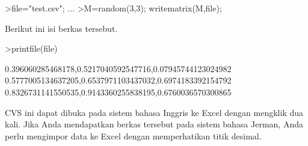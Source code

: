 \documentclass[a4paper,10pt]{article}
\begin{document}
\begin{eulernotebook}
\begin{eulercomment}
\begin{eulercomment}
\begin{eulercomment}
\begin{eulercomment}
\begin{eulercomment}
\begin{eulercomment}
\begin{eulercomment}
\begin{eulercomment}
\begin{eulercomment}
\begin{eulercomment}
\begin{eulercomment}
\begin{eulercomment}
\begin{eulercomment}
\begin{eulercomment}
\begin{eulercomment}
\begin{eulercomment}
\begin{eulercomment}
\begin{eulercomment}
\begin{eulercomment}
\begin{eulercomment}
\begin{eulercomment}
\begin{eulercomment}
\begin{eulercomment}
\begin{eulercomment}
\begin{eulercomment}
\begin{eulercomment}
\begin{eulercomment}
\begin{eulercomment}
\begin{eulercomment}
\begin{eulercomment}
\begin{eulercomment}
\begin{eulercomment}
\begin{eulercomment}
\begin{eulercomment}
\begin{eulercomment}
\begin{eulercomment}
\begin{eulerprompt}
>file="test.csv";  ...
>M=random(3,3); writematrix(M,file);
\end{eulerprompt}
\begin{eulercomment}
Berikut ini isi berkas tersebut.
\end{eulercomment}
\begin{eulerprompt}
>printfile(file)
\end{eulerprompt}
\begin{euleroutput}
  0.396060285468178,0.5217040592547716,0.07945744123024982
  0.5777005134637205,0.6537971103437032,0.6974183392154792
  0.8326731141550535,0.9143360255838195,0.6760036570300865
  
\end{euleroutput}
\begin{eulercomment}
CVS ini dapat dibuka pada sistem bahasa Inggris ke Excel dengan
mengklik dua kali. Jika Anda mendapatkan berkas tersebut pada sistem
bahasa Jerman, Anda perlu mengimpor data ke Excel dengan memperhatikan
titik desimal.


\end{eulercomment}
\end{eulercomment}
\end{eulercomment}
\end{eulercomment}
\end{eulercomment}
\end{eulercomment}
\end{eulercomment}
\end{eulercomment}
\end{eulercomment}
\end{eulercomment}
\end{eulercomment}
\end{eulercomment}
\end{eulercomment}
\end{eulercomment}
\end{eulercomment}
\end{eulercomment}
\end{eulercomment}
\end{eulercomment}
\end{eulercomment}
\end{eulercomment}
\end{eulercomment}
\end{eulercomment}
\end{eulercomment}
\end{eulercomment}
\end{eulercomment}
\end{eulercomment}
\end{eulercomment}
\end{eulercomment}
\end{eulercomment}
\end{eulercomment}
\end{eulercomment}
\end{eulercomment}
\end{eulercomment}
\end{eulercomment}
\end{eulercomment}
\end{eulercomment}
\end{eulercomment}
\end{eulernotebook}
\end{document}
